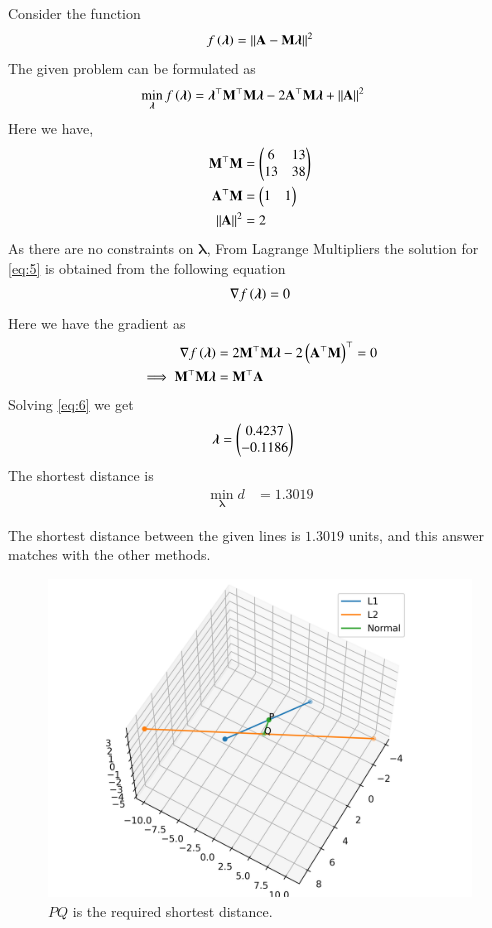 \documentclass[journal,12pt,twocolumn]{IEEEtran}
\begin{document}
\begin{enumerate}
Consider the function
\begin{align}
f\left(\bm{\lambda}\right) = \left\lVert\mathbf{A}-\mathbf{M}\bm{\lambda}\right\rVert^2
\end{align}
The given problem can be formulated as 
\begin{align}
\min_{\bm{\lambda}} f\left(\bm{\lambda}\right) &= \bm{\lambda}^{\top}\mathbf{M}^\top\mathbf{M}\bm{\lambda} - 2\mathbf{A}^\top\mathbf{M}\bm{\lambda}+\left\lVert\mathbf{A}\right\rVert^2 \label{eq:5}
\end{align}
Here we have,
\begin{align}
\mathbf{M}^\top\mathbf{M} &= \begin{pmatrix}6&13 \\ 13&38\end{pmatrix}\\
\mathbf{A}^\top\mathbf{M} &= \begin{pmatrix}1&1\end{pmatrix}\\
\left\lVert\mathbf{A}\right\rVert^2 &= 2
\end{align}
As there are no constraints on $\bm{\lambda}$, From Lagrange Multipliers the solution for \eqref{eq:5} is obtained from the following equation
\begin{align}
\nabla f\left(\bm{\lambda}\right) = 0
\end{align}
Here we have the gradient as
\begin{align}
\nabla f\left(\bm{\lambda}\right) &= 2\mathbf{M}^\top\mathbf{M} \bm{\lambda} - 2\left(\mathbf{A}^\top\mathbf{M}\right)^\top = 0\\
\implies \mathbf{M}^\top\mathbf{M} \bm{\lambda} &= \mathbf{M}^\top\mathbf{A}
\label{eq:6}
\end{align}
Solving \eqref{eq:6} we get
\begin{align}
\bm{\lambda} &= \begin{pmatrix}0.4237 \\-0.1186\end{pmatrix}
\end{align}
The shortest distance is
\begin{align}
\min_{\bm{\lambda}} d &= 1.3019  
\end{align}

The shortest distance between the given lines is $1.3019$ units, and this answer matches with the other methods.

\begin{figure}[!ht]
\centering
\includegraphics[width=\columnwidth]{./figs/skew.png}
\caption{$PQ$ is the required shortest distance.}
\end{figure}
\end{enumerate}
\end{document}
